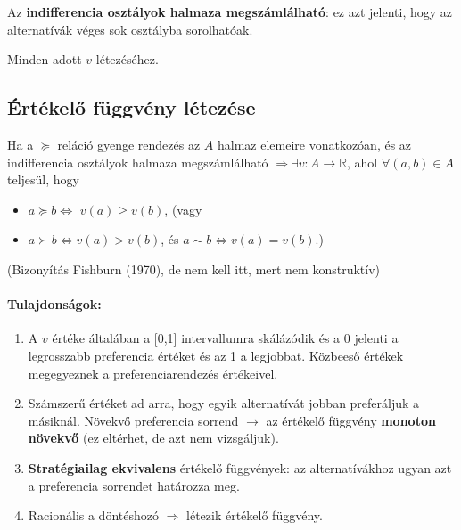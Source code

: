 \documentclass[a4paper,12pt]{article}
\begin{document}
Az \textbf{indifferencia osztályok halmaza megszámlálható}: ez azt jelenti, hogy az alternatívák véges sok osztályba sorolhatóak.

Minden adott $v$ létezéséhez.

\subsection{Értékelő függvény létezése}

Ha a $\succeq$ reláció gyenge rendezés az $A$ halmaz elemeire vonatkozóan, és az indifferencia osztályok halmaza megszámlálható $\Rightarrow \exists v: A \rightarrow \mathbb{R} $, ahol $\forall(a,b) \in A$ teljesül, hogy 
\begin{itemize}
\item $a \succeq b \Leftrightarrow$  $v(a) \geq v(b)$, (vagy
\item $a \succ b \Leftrightarrow v(a) > v(b)$, és $a \sim  b \Leftrightarrow v(a) = v(b).$)
\end{itemize}
(Bizonyítás Fishburn (1970), de nem kell itt, mert nem konstruktív)



\paragraph{Tulajdonságok:}

\begin{enumerate}

\item A $v$ értéke általában a [0,1] intervallumra skálázódik és a 0 jelenti a legrosszabb preferencia értéket és az 1 a legjobbat. Közbeeső értékek megegyeznek a preferenciarendezés értékeivel.

\item Számszerű értéket ad arra, hogy egyik alternatívát jobban preferáljuk a másiknál. Növekvő preferencia sorrend $\rightarrow$ az értékelő függvény \textbf{monoton növekvő} (ez eltérhet, de azt nem vizsgáljuk).

\item \textbf{Stratégiailag ekvivalens} értékelő függvények: az alternatívákhoz ugyan azt a preferencia sorrendet határozza meg.


\item Racionális a döntéshozó $\Rightarrow$ létezik értékelő függvény.

\end{enumerate}

\end{document}
